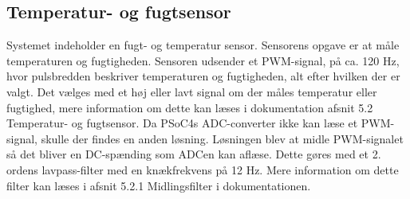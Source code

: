 \subsection{Temperatur- og fugtsensor}

Systemet indeholder  en fugt- og temperatur sensor. Sensorens opgave er at måle temperaturen og fugtigheden.
Sensoren udsender et PWM-signal, på ca. 120 Hz, hvor pulsbredden beskriver temperaturen og fugtigheden,  alt efter hvilken der er valgt. Det vælges med et høj eller lavt signal om der måles temperatur eller fugtighed, mere information om dette kan læses i dokumentation afsnit 5.2 Temperatur- og fugtsensor.
Da PSoC4s ADC-converter ikke kan læse et PWM-signal, skulle der findes en anden løsning. Løsningen blev at midle PWM-signalet så det bliver en DC-spænding som ADCen kan aflæse. Dette gøres med et 2. ordens lavpass-filter med en knækfrekvens på 12 Hz. Mere information om dette filter kan læses i afsnit 5.2.1 Midlingsfilter i dokumentationen. 